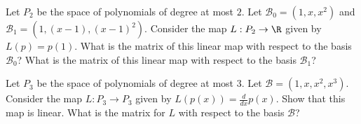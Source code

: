 \begin{problem}
	Let $P_2$ be the space of polynomials of degree at most $2$.  Let $\mathcal{B}_0 = (1,x,x^2)$ and $\mathcal{B}_1 = (1,(x-1),(x-1)^2)$.  
	Consider the map $L:P_2 \to \R$ given by $L(p) = p(1)$.  What is the matrix of this linear map with respect to the basis $\mathcal{B}_0$?  
	What is the matrix of this linear map with respect to the basis $\mathcal{B}_1$?  
\end{problem}

\begin{problem}
	Let $P_3$ be the space of polynomials of degree at most $3$.  Let $\mathcal{B} = (1,x,x^2,x^3)$.  Consider the map $L:P_3 \to P_3$ given by 
	$L(p(x)) = \frac{d}{dx} p(x)$.  Show that this map is linear.  What is the matrix for $L$ with respect to the basis $\mathcal{B}$?
\end{problem}

